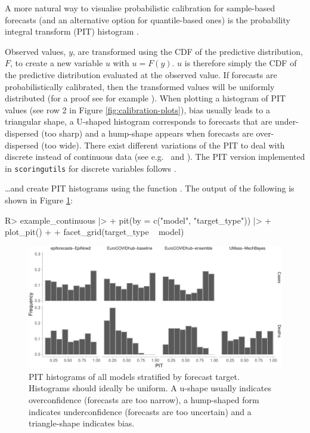 \documentclass[
]{jss}
\begin{document}
A more natural way to visualise probabilistic calibration for
sample-based forecasts (and an alternative option for quantile-based
ones) is the probability integral transform (PIT) histogram
\citep{dawidPresentPositionPotential1984}.

Observed values, \(y\), are transformed using the CDF of the predictive
distribution, \(F\), to create a new variable \(u\) with \(u = F(y)\).
\(u\) is therefore simply the CDF of the predictive distribution
evaluated at the observed value. If forecasts are probabilistically
calibrated, then the transformed values will be uniformly distributed
(for a proof see for example
\citet{angusProbabilityIntegralTransform1994}). When plotting a
histogram of PIT values (see row 2 in Figure
\ref{fig:calibration-plots}), bias usually leads to a triangular shape,
a U-shaped histogram corresponds to forecasts that are under-dispersed
(too sharp) and a hump-shape appears when forecasts are over-dispersed
(too wide). There exist different variations of the PIT to deal with
discrete instead of continuous data (see
e.g.~\cite{czadoPredictiveModelAssessment2009} and
\cite{funkAssessingPerformanceRealtime2019}). The PIT version
implemented in \texttt{scoringutils} for discrete variables follows
\cite{funkAssessingPerformanceRealtime2019}.

\ldots and create PIT histograms using the function .
The output of the following is shown in Figure \ref{fig:pit-plots}:

\begin{CodeChunk}
\begin{CodeInput}
R> example_continuous |>
+   pit(by = c("model", "target_type")) |>
+   plot_pit() + 
+   facet_grid(target_type ~ model)
\end{CodeInput}
\begin{figure}[!h]

{\centering \includegraphics[width=1\linewidth]{manuscript_files/figure-latex/pit-plots-1} 

}

\caption[PIT histograms of all models stratified by forecast target]{PIT histograms of all models stratified by forecast target. Histograms should ideally be uniform. A u-shape usually indicates overconfidence (forecasts are too narrow), a hump-shaped form indicates underconfidence (forecasts are too uncertain) and a triangle-shape indicates bias.}\label{fig:pit-plots}
\end{figure}
\end{CodeChunk}
\end{document}
